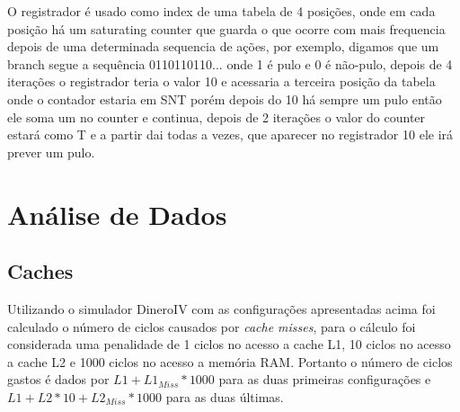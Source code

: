 \documentclass[pdftex,12pt,a4paper]{article}
\begin{document}
O registrador é usado como index de uma tabela de 4 posições, onde em cada posição há um saturating 
counter que guarda o que ocorre com mais frequencia depois de uma determinada sequencia de ações, 
por exemplo, digamos que um branch segue a sequência 0110110110... onde 1 é pulo e 0 é não-pulo, 
depois de 4 iterações o registrador teria o valor 10 e acessaria a terceira posição da tabela 
onde o contador estaria em SNT porém depois do 10 há sempre um pulo então ele soma um no counter 
e continua, depois de 2 iterações o valor do counter estará como T e a partir dai todas a vezes,
que aparecer no registrador 10 ele irá prever um pulo.

\section{Análise de Dados}

\subsection{Caches}

Utilizando o simulador DineroIV com as configurações apresentadas acima foi 
calculado o número de ciclos causados por \textit{cache misses}, para o cálculo 
foi considerada uma penalidade de 1 ciclos no acesso a cache L1, 10 ciclos 
no acesso a cache L2 e 1000 ciclos no acesso a memória RAM. Portanto o número 
de ciclos gastos é dados por $L1 + L1_{Miss}*1000$ para as duas primeiras 
configurações e $L1 + L2*10 + L2_{Miss}*1000$ para as duas últimas.
\end{document}

